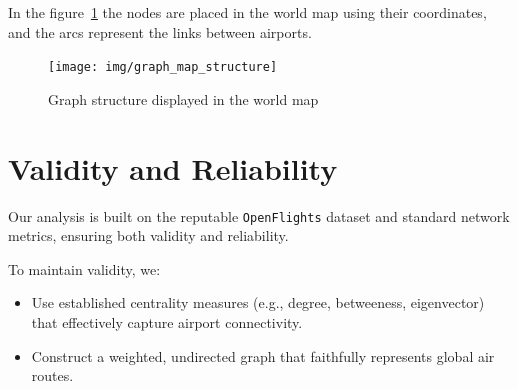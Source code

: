 \documentclass[12pt]{article}
\begin{document}
    In the figure~\ref{fig:world-graph} the nodes are placed in the world map using their coordinates, and the arcs represent the links between airports.

    \begin{figure}[H]
        \centering
        \texttt{[image: img/graph\_map\_structure]}
        \caption{Graph structure displayed in the world map}
        \label{fig:world-graph}
    \end{figure}

    \section{Validity and Reliability}\label{sec:validity-and-reliability}
    Our analysis is built on the reputable \texttt{OpenFlights} dataset and standard network metrics, ensuring both validity and reliability.

    To maintain validity, we:
    \begin{itemize}
        \item Use established centrality measures (e.g., degree, betweeness, eigenvector) that effectively capture airport connectivity.
        \item Construct a weighted, undirected graph that faithfully represents global air routes.
    \end{itemize}
\end{document}

